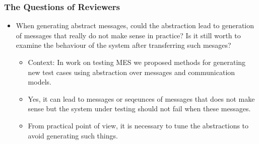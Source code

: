 \documentclass{beamer}
\newcommand{\hlgr}[1]{\textcolor{olive!50!green}{#1}}
\begin{document}
\begin{frame}[noframenumbering]
	\frametitle{The Questions of Reviewers}
	\begin{itemize}
	  \item \hlgr{When generating abstract messages, could the abstraction lead to generation of messages that really do not make sense in practice? Is it still worth to examine the behaviour of the system after transferring such mesages?}
	  \begin{itemize}
            \item Context: In work on testing MES we proposed methods for generating new test cases using abstraction over messages and communication models.
            \item Yes, it can lead to messages or seqeunces of messages that does not make sense but the system under testing should not fail when these messages.
            \item From practical point of view, it is necessary to tune the abstractions to avoid generating such things.
	  \end{itemize}
	\end{itemize}
\end{frame}
\end{document}
